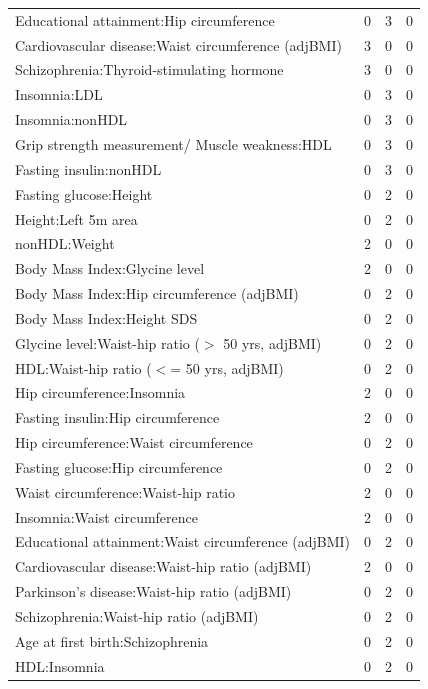 \begin{table}[ht]
\begin{tabular}{lrrr}
  Educational attainment:Hip circumference &   0 &   3 &   0 \\ 
  Cardiovascular disease:Waist circumference (adjBMI) &   3 &   0 &   0 \\ 
  Schizophrenia:Thyroid-stimulating hormone &   3 &   0 &   0 \\ 
  Insomnia:LDL &   0 &   3 &   0 \\ 
  Insomnia:nonHDL &   0 &   3 &   0 \\ 
  Grip strength measurement/ Muscle weakness:HDL &   0 &   3 &   0 \\ 
  Fasting insulin:nonHDL &   0 &   3 &   0 \\ 
  Fasting glucose:Height &   0 &   2 &   0 \\ 
  Height:Left 5m area &   0 &   2 &   0 \\ 
  nonHDL:Weight &   2 &   0 &   0 \\ 
  Body Mass Index:Glycine level &   2 &   0 &   0 \\ 
  Body Mass Index:Hip circumference (adjBMI) &   0 &   2 &   0 \\ 
  Body Mass Index:Height SDS &   0 &   2 &   0 \\ 
  Glycine level:Waist-hip ratio ($>$ 50 yrs, adjBMI) &   0 &   2 &   0 \\ 
  HDL:Waist-hip ratio ($<$= 50 yrs, adjBMI) &   0 &   2 &   0 \\ 
  Hip circumference:Insomnia &   2 &   0 &   0 \\ 
  Fasting insulin:Hip circumference &   2 &   0 &   0 \\ 
  Hip circumference:Waist circumference &   0 &   2 &   0 \\ 
  Fasting glucose:Hip circumference &   0 &   2 &   0 \\ 
  Waist circumference:Waist-hip ratio &   2 &   0 &   0 \\ 
  Insomnia:Waist circumference &   2 &   0 &   0 \\ 
  Educational attainment:Waist circumference (adjBMI) &   0 &   2 &   0 \\ 
  Cardiovascular disease:Waist-hip ratio (adjBMI) &   2 &   0 &   0 \\ 
  Parkinson's disease:Waist-hip ratio (adjBMI) &   0 &   2 &   0 \\ 
  Schizophrenia:Waist-hip ratio (adjBMI) &   0 &   2 &   0 \\ 
  Age at first birth:Schizophrenia &   0 &   2 &   0 \\ 
  HDL:Insomnia &   0 &   2 &   0 \\ 

\end{tabular}
\end{table}
